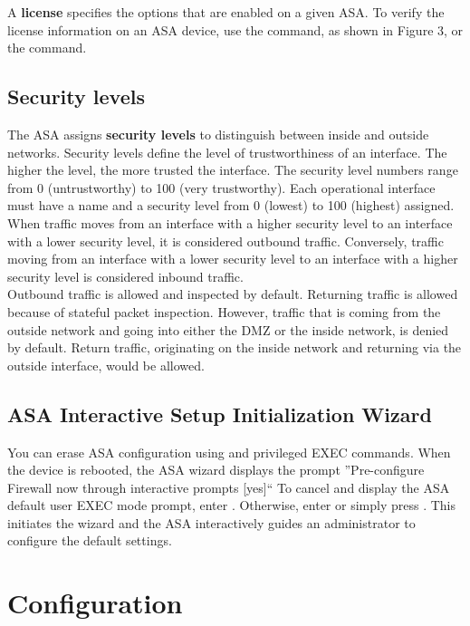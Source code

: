 A \textbf{license} specifies the options that are enabled on a given ASA. To verify the license information on an ASA device, use the  command, as shown in Figure 3, or the  command.\\

\subsection{Security levels}

The ASA assigns \textbf{security levels} to distinguish between inside and outside networks. Security levels define the level of trustworthiness of an interface. The higher the level, the more trusted the interface. The security level numbers range from 0 (untrustworthy) to 100 (very trustworthy). Each operational interface must have a name and a security level from 0 (lowest) to 100 (highest) assigned.\\

When traffic moves from an interface with a higher security level to an interface with a lower security level, it is considered outbound traffic. Conversely, traffic moving from an interface with a lower security level to an interface with a higher security level is considered inbound traffic.\\

Outbound traffic is allowed and inspected by default. Returning traffic is allowed because of stateful packet inspection. However, traffic that is coming from the outside network and going into either the DMZ or the inside network, is denied by default. Return traffic, originating on the inside network and returning via the outside interface, would be allowed. 

\subsection{ASA Interactive Setup Initialization Wizard}

You can erase ASA configuration using  and  privileged EXEC commands. When the device is rebooted, the ASA wizard displays the prompt ''Pre-configure Firewall now through interactive prompts [yes]`` To cancel and display the ASA default user EXEC mode prompt, enter . Otherwise, enter  or simply press . This initiates the wizard and the ASA interactively guides an administrator to configure the default settings.

\section{Configuration}

